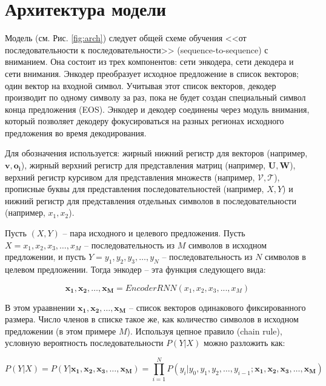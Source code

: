 \documentclass[12pt, a4paper]{article}
\begin{document}
    \section{Архитектура модели}
        Модель (см. Рис. \ref{fig:arch}) следует общей схеме обучения <<от последовательности к последовательности>> (sequence-to-sequence) с вниманием. Она состоит из трех компонентов: сети энкодера, сети декодера и сети внимания. Энкодер преобразует исходное предложение в список векторов; один вектор на входной символ. Учитывая этот список векторов, декодер производит по одному символу за раз, пока не будет создан специальный символ конца предложения (EOS). Энкодер и декодер соединены через модуль внимания, который позволяет декодеру фокусироваться на разных регионах исходного предложения во время декодирования.

        Для обозначения используется: жирный нижний регистр для векторов (например, $\mathbf{v}, \mathbf{o_i}$), жирный верхний регистр для представления матриц (например, $\mathbf{U}, \mathbf{W}$), верхний регистр курсивом для представления множеств (например, $\mathscr{V}, \mathscr{T}$), прописные буквы для представления последовательностей (например, $X, Y$) и нижний регистр для представления отдельных символов в последовательности (например, $x_1, x_2$).

        Пусть $(X, Y)$ -- пара исходного и целевого предложения. Пусть $X = x_1, x_2, x_3, \dots, x_M$ -- последовательность из $M$ символов в исходном предложении, и пусть $Y = y_1, y_2, y_3, \dots, y_N$ -- последовательность из $N$ символов в целевом предложении. Тогда энкодер -- эта функция следующего вида:

        \begin{equation}
            \mathbf{x_1, x_2, \dots, x_M} = \textit{EncoderRNN}(x_1, x_2, x_3, ..., x_M)
        \end{equation}

        В этом ураавнении $\mathbf{x_1, x_2, \dots, x_M}$ -- список векторов одинакового фиксированного размера. Число членов в списке такое же, как количество символов в исходном предложении (в этом примере $M$). Используя цепное правило (chain rule), условную вероятность последовательности $P(Y|X)$ можно разложить как:

        \begin{equation}
            P(Y|X) = P(Y|\mathbf{x_1, x_2, x_3, \dots, x_M}) = \prod_{i=1}^{N}P(y_i|y_0, y_1, y_2, \dots, y_{i-1};\mathbf{x_1, x_2, x_3, \dots, x_M})
        \end{equation}
\end{document}
